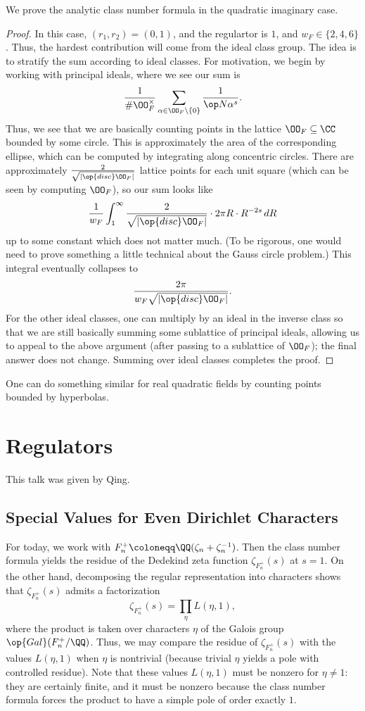 \documentclass{article}
\begin{document}
\begin{proposition}
	We prove the analytic class number formula in the quadratic imaginary case.
\end{proposition}
\begin{proof}
	In this case, $(r_1,r_2)=(0,1)$, and the regulartor is $1$, and $w_F\in\{2,4,6\}$. Thus, the hardest contribution will come from the ideal class group. The idea is to stratify the sum according to ideal classes. For motivation, we begin by working with principal ideals, where we see our sum is
	\[\frac1{\#\OO_F^\times}\sum_{\alpha\in\OO_F\setminus\{0\}}\frac1{\op N\alpha^s}.\]
	Thus, we see that we are basically counting points in the lattice $\OO_F\subseteq\CC$ bounded by some circle. This is approximately the area of the corresponding ellipse, which can be computed by integrating along concentric circles. There are approximately $\frac2{\sqrt{\left|\op{disc}\OO_F\right|}}$ lattice points for each unit square (which can be seen by computing $\OO_F$), so our sum looks like
	\[\frac1{w_F}\int_1^\infty\frac2{\sqrt{\left|\op{disc}\OO_F\right|}}\cdot2\pi R\cdot R^{-2s}\,dR\]
	up to some constant which does not matter much. (To be rigorous, one would need to prove something a little technical about the Gauss circle problem.) This integral eventually collapses to
	\[\frac{2\pi}{w_F\sqrt{\left|\op{disc}\OO_F\right|}}.\]
	For the other ideal classes, one can multiply by an ideal in the inverse class so that we are still basically summing some sublattice of principal ideals, allowing us to appeal to the above argument (after passing to a sublattice of $\OO_F$); the final answer does not change. Summing over ideal classes completes the proof.
\end{proof}
\begin{remark}
	One can do something similar for real quadratic fields by counting points bounded by hyperbolas.
\end{remark}

\section{Regulators}
This talk was given by Qing.

\subsection{Special Values for Even Dirichlet Characters}
For today, we work with $F_n^+\coloneqq\QQ(\zeta_n+\zeta_n^{-1})$. Then the class number formula yields the residue of the Dedekind zeta function $\zeta_{F_n^+}(s)$ at $s=1$. On the other hand, decomposing the regular representation into characters shows that $\zeta_{F_n^+}(s)$ admits a factorization
\[\zeta_{F_n^+}(s)=\prod_\eta L(\eta,1),\]
where the product is taken over characters $\eta$ of the Galois group $\op{Gal}(F_n^+/\QQ)$. Thus, we may compare the residue of $\zeta_{F_n^+}(s)$ with the values $L(\eta,1)$ when $\eta$ is nontrivial (because trivial $\eta$ yields a pole with controlled residue). Note that these values $L(\eta,1)$ must be nonzero for $\eta\ne1$: they are certainly finite, and it must be nonzero because the class number formula forces the product to have a simple pole of order exactly $1$.
\end{document}
